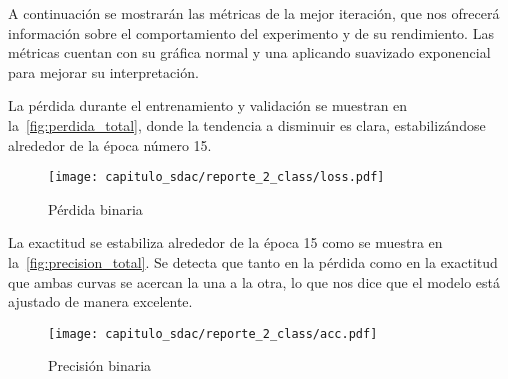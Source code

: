 \begin{table}[H]
    \centering
    \caption{Estadísticos del experimento binario}\label{tabla:estadisticos}
    \end{table}

A continuación se mostrarán las métricas de la mejor iteración, que nos ofrecerá
información sobre el comportamiento del experimento y de su rendimiento. Las
métricas cuentan con su gráfica normal y una aplicando suavizado exponencial
para mejorar su interpretación.

La pérdida durante el entrenamiento y validación se muestran en
la~\autoref{fig:perdida_total}, donde la tendencia a disminuir es clara,
estabilizándose alrededor de la época número 15.

\begin{figure}[H]
    \centering
    \texttt{[image: capitulo\_sdac/reporte\_2\_class/loss.pdf]}
    \caption{Pérdida binaria}\label{fig:perdida_total}
\end{figure}

La exactitud se estabiliza alrededor de la época 15 como se muestra en
la~\autoref{fig:precision_total}. Se detecta que tanto en la pérdida como en la
exactitud que ambas curvas se acercan la una a la otra, lo que nos dice que el
modelo está ajustado de manera excelente.

\begin{figure}[H]
    \centering
    \texttt{[image: capitulo\_sdac/reporte\_2\_class/acc.pdf]}
    \caption{Precisión binaria}\label{fig:precision_total}
\end{figure}
    
